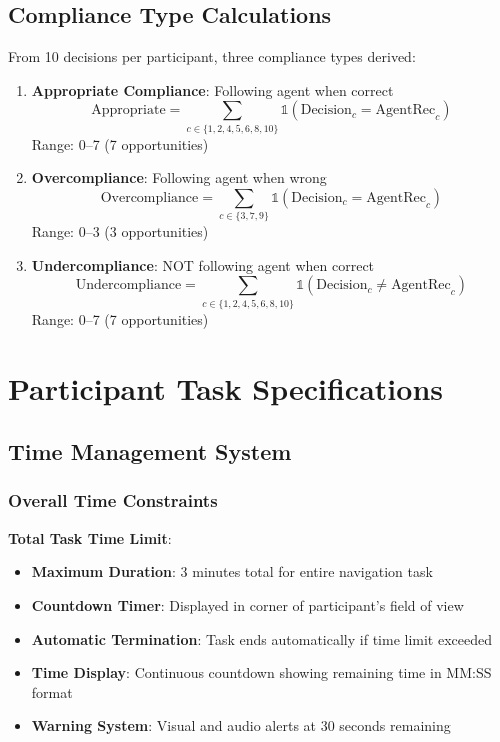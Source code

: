 \documentclass[12pt]{article}
\begin{document}
\subsection{Compliance Type Calculations}

From 10 decisions per participant, three compliance types derived:

\begin{enumerate}
    \item \textbf{Appropriate Compliance}: Following agent when correct
    \begin{equation}
    \text{Appropriate} = \sum_{c \in \{1,2,4,5,6,8,10\}} \mathbb{1}(\text{Decision}_c = \text{AgentRec}_c)
    \end{equation}
    Range: 0--7 (7 opportunities)
    
    \item \textbf{Overcompliance}: Following agent when wrong
    \begin{equation}
    \text{Overcompliance} = \sum_{c \in \{3,7,9\}} \mathbb{1}(\text{Decision}_c = \text{AgentRec}_c)
    \end{equation}
    Range: 0--3 (3 opportunities)
    
    \item \textbf{Undercompliance}: NOT following agent when correct
    \begin{equation}
    \text{Undercompliance} = \sum_{c \in \{1,2,4,5,6,8,10\}} \mathbb{1}(\text{Decision}_c \neq \text{AgentRec}_c)
    \end{equation}
    Range: 0--7 (7 opportunities)
\end{enumerate}

\section{Participant Task Specifications}

\subsection{Time Management System}

\subsubsection{Overall Time Constraints}

\textbf{Total Task Time Limit}:
\begin{itemize}
    \item \textbf{Maximum Duration}: 3 minutes total for entire navigation task
    \item \textbf{Countdown Timer}: Displayed in corner of participant's field of view
    \item \textbf{Automatic Termination}: Task ends automatically if time limit exceeded
    \item \textbf{Time Display}: Continuous countdown showing remaining time in MM:SS format
    \item \textbf{Warning System}: Visual and audio alerts at 30 seconds remaining
\end{itemize}
\end{document}
